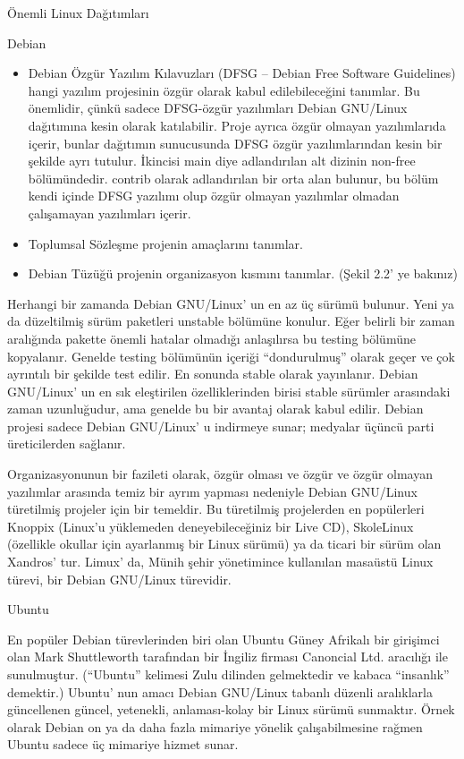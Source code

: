 \begin{section}{Önemli Linux Dağıtımları}
\begin{subsection}{Debian}
\begin{itemize}
 \item Debian Özgür Yazılım Kılavuzları (DFSG – Debian Free Software Guidelines) hangi yazılım projesinin özgür olarak kabul edilebileceğini tanımlar. Bu önemlidir, çünkü sadece DFSG-özgür yazılımları Debian GNU/Linux dağıtımına kesin olarak katılabilir. Proje ayrıca özgür olmayan yazılımlarıda içerir, bunlar dağıtımın sunucusunda DFSG özgür yazılımlarından kesin bir şekilde ayrı tutulur. İkincisi main diye adlandırılan alt dizinin non-free bölümündedir. contrib olarak adlandırılan bir orta alan bulunur, bu bölüm kendi içinde DFSG yazılımı olup özgür olmayan yazılımlar olmadan çalışamayan yazılımları içerir.
 \item Toplumsal Sözleşme projenin amaçlarını tanımlar.
 \item Debian Tüzüğü projenin organizasyon kısmını tanımlar. (Şekil 2.2' ye bakınız)
\end{itemize}

Herhangi bir zamanda Debian GNU/Linux' un en az üç sürümü bulunur. Yeni ya da düzeltilmiş sürüm paketleri unstable bölümüne konulur. Eğer belirli bir zaman aralığında pakette önemli hatalar olmadığı anlaşılırsa bu testing bölümüne kopyalanır. Genelde testing bölümünün içeriği “dondurulmuş” olarak geçer ve çok ayrıntılı bir şekilde test edilir. En sonunda stable olarak yayınlanır. Debian GNU/Linux' un en sık eleştirilen özelliklerinden birisi stable sürümler arasındaki zaman uzunluğudur, ama genelde bu bir avantaj olarak kabul edilir. Debian projesi sadece Debian GNU/Linux' u indirmeye sunar; medyalar üçüncü parti üreticilerden sağlanır.

Organizasyonunun bir fazileti olarak, özgür olması ve özgür ve özgür olmayan yazılımlar arasında temiz bir ayrım yapması nedeniyle Debian GNU/Linux türetilmiş projeler için bir temeldir. Bu türetilmiş projelerden en popülerleri Knoppix (Linux'u yüklemeden deneyebileceğiniz bir Live CD), SkoleLinux (özellikle okullar için ayarlanmış bir Linux sürümü) ya da ticari bir sürüm olan Xandros' tur. Limux' da, Münih şehir yönetimince kullanılan masaüstü Linux türevi, bir Debian GNU/Linux türevidir.

\end{subsection}
\begin{subsection}{Ubuntu}

En popüler Debian türevlerinden biri olan Ubuntu Güney Afrikalı bir girişimci olan Mark Shuttleworth tarafından bir İngiliz firması Canoncial Ltd. aracılığı ile sunulmuştur. (“Ubuntu” kelimesi Zulu dilinden gelmektedir ve kabaca “insanlık” demektir.) Ubuntu' nun amacı Debian GNU/Linux tabanlı düzenli aralıklarla güncellenen güncel, yetenekli, anlaması-kolay bir Linux sürümü sunmaktır. Örnek olarak Debian on ya da daha fazla mimariye yönelik çalışabilmesine rağmen Ubuntu sadece üç mimariye hizmet sunar.


\end{subsection}
\end{section}
